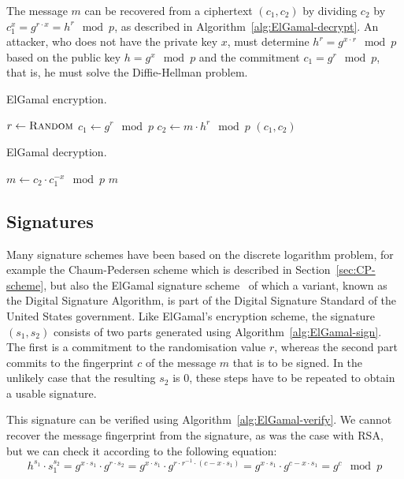 The message $m$ can be recovered from a ciphertext $(c_1, c_2)$ by dividing
$c_2$ by $c_1^x = g^{r \cdot x} = h^r \mod p$, as described in Algorithm~\ref{alg:ElGamal-decrypt}. An attacker, who does not have
the private key $x$, must determine $h^r = g^{x \cdot r} \mod p$ based on the
public key $h = g^x \mod p$ and the commitment $c_1 = g^r \mod p$, that is, he
must solve the Diffie-Hellman problem.

\begin{algorithm}[ht]
  \caption{ElGamal encryption.}
  \label{alg:ElGamal-encrypt}
  \addtolength{\baselineskip}{1mm}
  \begin{algorithmic}[1]
      \State $r \gets \Call{Random}{}$
      \State $c_1 \gets g^r \mod p$
      \State $c_2 \gets m \cdot h^r \mod p$
      \Return $(c_1, c_2)$
    \EndFunction
  \end{algorithmic}
\end{algorithm}
\begin{algorithm}[ht]
  \caption{ElGamal decryption.}
  \label{alg:ElGamal-decrypt}
  \addtolength{\baselineskip}{1mm}
  \begin{algorithmic}[1]
      \State $m \gets c_2 \cdot c_1^{-x} \mod p$
      \Return $m$
    \EndFunction
  \end{algorithmic}
\end{algorithm}

\subsection{Signatures}

Many signature schemes have been based on the discrete logarithm problem, for
example the Chaum-Pedersen scheme which is described in
Section~\ref{sec:CP-scheme}, but also the ElGamal signature scheme~\cite{ElGamal1985}
of which a variant, known as the Digital Signature Algorithm, is part of the
Digital Signature Standard of the United States government.
Like ElGamal's encryption scheme, the signature $(s_1, s_2)$ consists of two
parts generated using Algorithm~\ref{alg:ElGamal-sign}. The first is a
commitment to the randomisation value $r$, whereas the second part commits to
the fingerprint $c$ of the message $m$ that is to be signed. In the unlikely
case that the resulting $s_2$ is 0, these steps have to be repeated to obtain a
usable signature.

This signature can be verified using Algorithm~\ref{alg:ElGamal-verify}. We
cannot recover the message fingerprint from the signature, as was the case
with RSA, but we can check it according to the following equation:
\begin{equation*}
  h^{s_1} \cdot s_1^{s_2}
  = g^{x \cdot s_1} \cdot g^{r \cdot s_2}
  = g^{x \cdot s_1} \cdot g^{r \cdot r^{-1} \cdot (c - x \cdot s_1)}
  = g^{x \cdot s_1} \cdot g^{c - x \cdot s_1}
  = g^c \mod p
\end{equation*}

